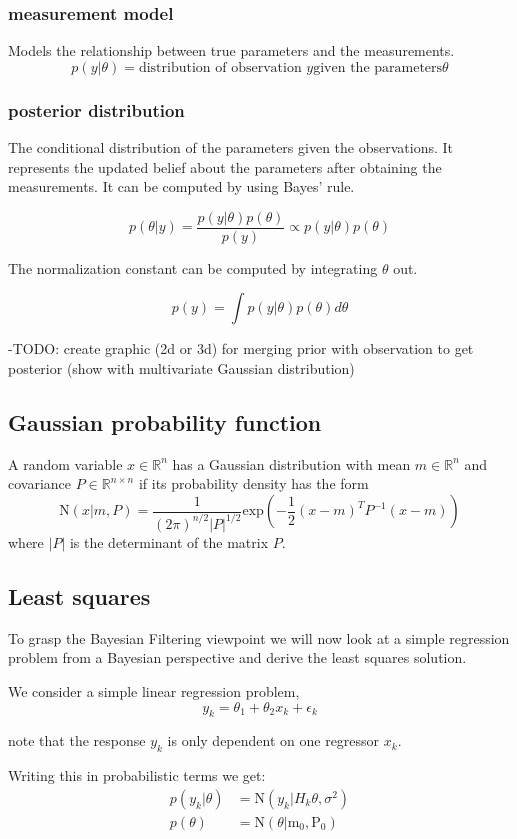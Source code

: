 \subsubsection{measurement model}
Models the relationship between true parameters and the measurements.
$$ p(y | \theta) = \text{distribution of observation } y
\text{given the parameters} \theta $$

\subsubsection{posterior distribution}
The conditional distribution of the parameters given the observations.
It represents the updated belief about the parameters
after obtaining the measurements. It can be computed by using Bayes' rule.

$$ p(\theta | y) = \frac{p(y | \theta) p(\theta)}{p(y)}
\propto p(y | \theta) p(\theta) $$

The normalization constant can be computed by integrating $\theta$ out.

$$ p(y) = \int p(y | \theta) p(\theta) d\theta $$

-TODO: create graphic (2d or 3d) for merging prior with observation to get
    posterior (show with multivariate Gaussian distribution)

\subsection{Gaussian probability function}
A random variable $x \in \mathbb{R}^n$ has a Gaussian distribution with mean
$m \in \mathbb{R}^n$ and covariance $P \in \mathbb{R}^{n\times n}$ if its
probability density has the form
$$ \text{N}(x | m, P) = \frac{1}{(2\pi)^{n / 2} |P|^{1/2}}
\text{exp} \left( -\frac{1}{2} (x - m)^T P^{-1} (x-m) \right) $$
where $|P|$ is the determinant of the matrix $P$.
    
\subsection{Least squares}
To grasp the Bayesian Filtering viewpoint we will now look
at a simple regression problem from a Bayesian perspective
and derive the least squares solution.

We consider a simple linear regression problem,
$$ y_k = \theta_1 + \theta_2 x_k + \epsilon_k $$

note that the response $y_k$ is only dependent on one regressor $x_k$.

Writing this in probabilistic terms we get:
\begin{align}
  p(y_k | \theta) &= \text{N}(y_k | H_k \theta, \sigma^2) \\
  p(\theta) &= \text{N}(\theta | \text{m}_0, \text{P}_0)
\end{align}

